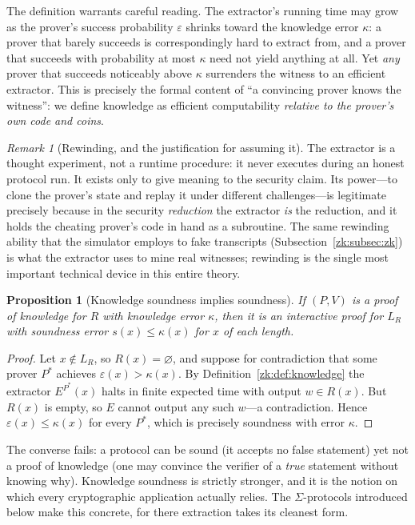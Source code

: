 \documentclass[11pt,a4paper]{article}
\newtheorem{proposition}[theorem]{Proposition}
\theoremstyle{definition}
\theoremstyle{remark}
\newtheorem{remark}[theorem]{Remark}
\begin{document}
The definition warrants careful reading. The extractor's running time may grow as the prover's success probability \(\varepsilon\) shrinks toward the knowledge error \(\kappa\): a prover that barely succeeds is correspondingly hard to extract from, and a prover that succeeds with probability at most \(\kappa\) need not yield anything at all. Yet \emph{any} prover that succeeds noticeably above \(\kappa\) surrenders the witness to an efficient extractor. This is precisely the formal content of ``a convincing prover knows the witness'': we define knowledge as efficient computability \emph{relative to the prover's own code and coins}.

\begin{remark}[Rewinding, and the justification for assuming it]\label{zk:rem:rewinding}
The extractor is a thought experiment, not a runtime procedure: it never executes during an honest protocol run. It exists only to give meaning to the security claim. Its power---to clone the prover's state and replay it under different challenges---is legitimate precisely because in the security \emph{reduction} the extractor \emph{is} the reduction, and it holds the cheating prover's code in hand as a subroutine. The same rewinding ability that the simulator employs to fake transcripts (Subsection~\ref{zk:subsec:zk}) is what the extractor uses to mine real witnesses; rewinding is the single most important technical device in this entire theory.
\end{remark}

\begin{proposition}[Knowledge soundness implies soundness]\label{zk:prop:ks-implies-s}
If \((P,V)\) is a proof of knowledge for \(R\) with knowledge error \(\kappa\), then it is an interactive proof for \(L_R\) with soundness error \(s(x) \le \kappa(x)\) for \(x\) of each length.
\end{proposition}

\begin{proof}
Let \(x \notin L_R\), so \(R(x) = \varnothing\), and suppose for contradiction that some prover \(P^*\) achieves \(\varepsilon(x) > \kappa(x)\). By Definition~\ref{zk:def:knowledge} the extractor \(E^{P^*}(x)\) halts in finite expected time with output \(w \in R(x)\). But \(R(x)\) is empty, so \(E\) cannot output any such \(w\)---a contradiction. Hence \(\varepsilon(x) \le \kappa(x)\) for every \(P^*\), which is precisely soundness with error \(\kappa\).
\end{proof}

The converse fails: a protocol can be sound (it accepts no false statement) yet not a proof of knowledge (one may convince the verifier of a \emph{true} statement without knowing why). Knowledge soundness is strictly stronger, and it is the notion on which every cryptographic application actually relies. The \(\Sigma\)-protocols introduced below make this concrete, for there extraction takes its cleanest form.
\end{document}
